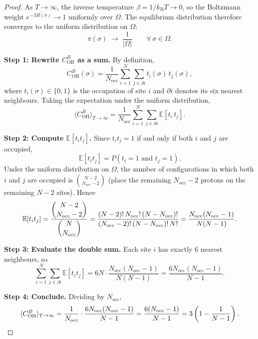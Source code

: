 \documentclass[12pt, a4paper]{article}
\theoremstyle{plain}
\theoremstyle{definition}
\newtheorem{remark}{Remark}[section]
\newcommand{\COH}{C_\mathrm{OH}^B}
\newcommand{\kB}{k_{\mathrm{B}}}
\newcommand{\Nocc}{N_\mathrm{occ}}
\begin{document}
\begin{proof}
As $T \to \infty$, the inverse temperature $\beta = 1/\kB T \to 0$,
so the Boltzmann weight $e^{-\beta H(\sigma)} \to 1$ uniformly
over $\Omega$.
The equilibrium distribution therefore converges to the uniform
distribution on $\Omega$:
\[
    \pi(\sigma) \;\to\; \frac{1}{|\Omega|}
    \qquad \forall\,\sigma \in \Omega.
\]

\textbf{Step 1: Rewrite $\COH$ as a sum.}
By definition,
\[
    \COH(\sigma)
    = \frac{1}{\Nocc}
      \sum_{i=1}^{N} \sum_{j \in \partial i} t_i(\sigma)\, t_j(\sigma),
\]
where $t_i(\sigma) \in \{0,1\}$ is the occupation of site $i$
and $\partial i$ denotes its six nearest neighbours.
Taking the expectation under the uniform distribution,
\[
    \langle \COH \rangle_{T\to\infty}
    = \frac{1}{\Nocc}
      \sum_{i=1}^{N} \sum_{j \in \partial i}
      \mathbb{E}[t_i\, t_j].
\]

\textbf{Step 2: Compute $\mathbb{E}[t_i t_j]$.}
Since $t_i t_j = 1$ if and only if both $i$ and $j$ are occupied,
\[
    \mathbb{E}[t_i t_j]
    = P(t_i = 1 \text{ and } t_j = 1).
\]
Under the uniform distribution on $\Omega$, the number of
configurations in which both $i$ and $j$ are occupied is
$\binom{N-2}{\Nocc - 2}$ (place the remaining $\Nocc-2$ protons
on the remaining $N-2$ sites).
Hence
\[
    \mathbb{E}[t_i t_j]
    = \frac{\dbinom{N-2}{\Nocc-2}}{\dbinom{N}{\Nocc}}
    = \frac{(N-2)!\,\Nocc!\,(N-\Nocc)!}{(N_{occ}-2)!\,(N-\Nocc)!\,N!}
    = \frac{\Nocc(\Nocc-1)}{N(N-1)}.
\]

\textbf{Step 3: Evaluate the double sum.}
Each site $i$ has exactly 6 nearest neighbours, so
\[
    \sum_{i=1}^{N} \sum_{j \in \partial i}
    \mathbb{E}[t_i t_j]
    = 6N \cdot \frac{\Nocc(\Nocc-1)}{N(N-1)}
    = \frac{6\Nocc(\Nocc-1)}{N-1}.
\]

\textbf{Step 4: Conclude.}
Dividing by $\Nocc$,
\[
    \langle \COH \rangle_{T\to\infty}
    = \frac{1}{\Nocc} \cdot \frac{6\Nocc(\Nocc-1)}{N-1}
    = \frac{6(\Nocc-1)}{N-1} = 3\left(1-\frac{1}{N-1}\right). \qedhere
\]
\end{proof}

\end{document}
